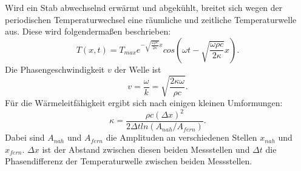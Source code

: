 \noindent Wird ein Stab abwechselnd erwärmt und abgekühlt, breitet sich wegen der periodischen Temperaturwechsel eine räumliche 
und zeitliche Temperaturwelle aus. Diese wird folgendermaßen beschrieben:
\begin{equation}
    T(x,t) = T_{max} e^{-\sqrt{\frac{\omega \rho c}{2 \kappa}} x} cos(\omega t - \sqrt{\frac{\omega \rho c}{2 \kappa}} x).
    \label{eq:Wellengleichung}
\end{equation}
Die Phasengeschwindigkeit $v$ der Welle ist
\begin{equation}
    v= \frac{\omega}{k} = \sqrt{\frac{2\kappa \omega}{\rho c}}.
    \label{eq:phasengesch}
\end{equation}
Für die Wärmeleitfähigkeit ergibt sich nach einigen kleinen Umformungen: %
\begin{equation}
    \kappa = \frac{\rho c (\Delta x)^2}{2 \Delta t ln(A_{nah}/A_{fern})}.
    \label{eq:Wärme}
\end{equation}
Dabei sind $A_{nah}$ und $A_{fern}$ die Amplituden an verschiedenen Stellen $x_{nah}$ und $x_{fern}$. $\Delta x$ ist 
der Abstand zwischen diesen beiden Messstellen und $\Delta t$ die Phasendifferenz der Temperaturwelle zwischen beiden 
Messstellen.
